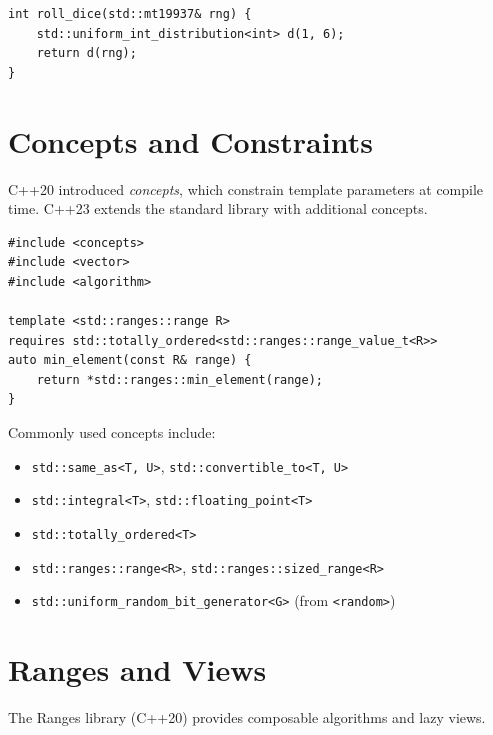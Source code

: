 \documentclass[twoside,12pt]{book}
\theoremstyle{plain}
\theoremstyle{definition}
\theoremstyle{remark}
\begin{document}
\begin{lstlisting}[caption={Passing a random engine by reference}]
int roll_dice(std::mt19937& rng) {
    std::uniform_int_distribution<int> d(1, 6);
    return d(rng);
}
\end{lstlisting}

\section{Concepts and Constraints}
\label{app:sec:concepts}

C++20 introduced \emph{concepts}, which constrain template parameters at
compile time. C++23 extends the standard library with additional concepts.

\begin{lstlisting}[caption={Using concepts to constrain templates}]
#include <concepts>
#include <vector>
#include <algorithm>

template <std::ranges::range R>
requires std::totally_ordered<std::ranges::range_value_t<R>>
auto min_element(const R& range) {
    return *std::ranges::min_element(range);
}
\end{lstlisting}

Commonly used concepts include:
\begin{itemize}
\item \texttt{std::same\_as<T, U>}, \texttt{std::convertible\_to<T, U>}
\item \texttt{std::integral<T>}, \texttt{std::floating\_point<T>}
\item \texttt{std::totally\_ordered<T>}
\item \texttt{std::ranges::range<R>}, \texttt{std::ranges::sized\_range<R>}
\item \texttt{std::uniform\_random\_bit\_generator<G>} (from \texttt{<random>})
\end{itemize}

\section{Ranges and Views}
\label{app:sec:ranges}

The Ranges library (C++20) provides composable algorithms and lazy views.
\end{document}
